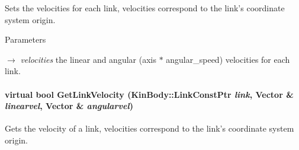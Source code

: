 Sets the velocities for each link, velocities correspond to the link's coordinate system origin. 


\begin{DoxyParams}{Parameters}
\item[\mbox{$\rightarrow$} {\em velocities}]the linear and angular (axis $\ast$ angular\_\-speed) velocities for each link. \end{DoxyParams}
\hypertarget{classOpenRAVE_1_1PhysicsEngineBase_a696a55b63521ab0e08b9b203d2b3bcdb}{
\paragraph[{GetLinkVelocity}]{\setlength{\rightskip}{0pt plus 5cm}virtual bool GetLinkVelocity (KinBody::LinkConstPtr {\em link}, \/  Vector \& {\em linearvel}, \/  Vector \& {\em angularvel})}\hfill}
\label{classOpenRAVE_1_1PhysicsEngineBase_a696a55b63521ab0e08b9b203d2b3bcdb}


Gets the velocity of a link, velocities correspond to the link's coordinate system origin. 


